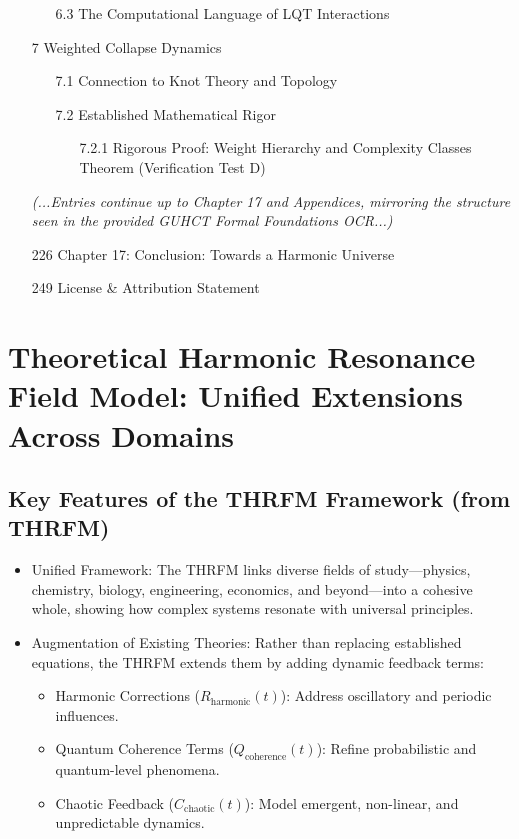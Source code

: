 \documentclass[11pt,a4paper]{article}
\begin{document}
\begin{itemize}
\begin{itemize}
        \item[6.3] The Computational Language of LQT Interactions 
    \end{itemize}
    \item[7] Weighted Collapse Dynamics 
    \begin{itemize}
        \item[7.1] Connection to Knot Theory and Topology 
        \item[7.2] Established Mathematical Rigor 
        \begin{itemize}
            \item[7.2.1] Rigorous Proof: Weight Hierarchy and Complexity Classes Theorem (Verification Test D) 
        \end{itemize}
    \end{itemize}
    \item[] \textit{(...Entries continue up to Chapter 17 and Appendices, mirroring the structure seen in the provided  GUHCT Formal Foundations OCR...)}
    \item[226] Chapter 17: Conclusion: Towards a Harmonic Universe 
    \item[249] License \& Attribution Statement 
\end{itemize}

\section*{Theoretical Harmonic Resonance Field Model: Unified Extensions Across Domains}
\label{app:thrfm_extensions}

\subsection*{Key Features of the THRFM Framework (from THRFM)}
\begin{itemize}
\item Unified Framework: The THRFM links diverse fields of study—physics, chemistry, biology, engineering, economics, and beyond—into a cohesive whole, showing how complex systems resonate with universal principles.
\item Augmentation of Existing Theories: Rather than replacing established equations, the THRFM extends them by adding dynamic feedback terms:
\begin{itemize}
\item Harmonic Corrections ($R_{\text{harmonic}}(t)$): Address oscillatory and periodic influences.
\item Quantum Coherence Terms ($Q_{\text{coherence}}(t)$): Refine probabilistic and quantum-level phenomena.
\item Chaotic Feedback ($C_{\text{chaotic}}(t)$): Model emergent, non-linear, and unpredictable dynamics.
\end{itemize}
\end{itemize}
\end{document}
